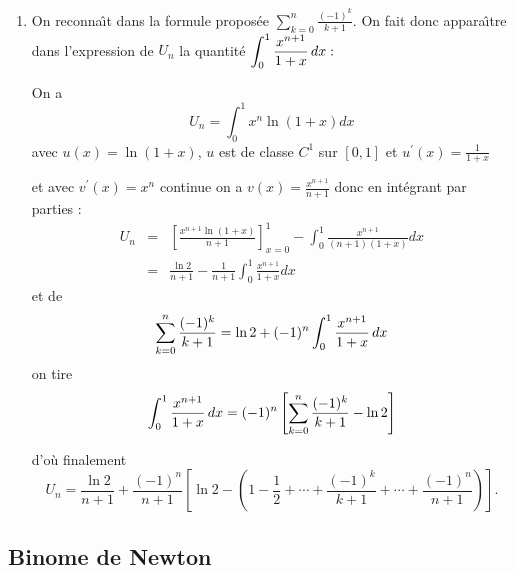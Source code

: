 \begin{correction}
\begin{enumerate}
\begin{enumerate}
\item On reconna\^{\i}t dans la formule propos\'{e}e $\displaystyle%
\sum_{k=0}^{n}\frac{(-1)^{k}}{k+1}$. On fait donc appara\^{\i}tre dans
l'expression de $U_{n}$ la quantit\'{e} $\displaystyle\int_{0}^{1}\frac{%
x^{n+1}}{1+x}\,dx:$

On a 
\begin{equation*}
U_{n}=\int_{0}^{1}x^{n}\ln \left( 1+x\right) dx
\end{equation*}
avec $u\left( x\right) =\ln \left( 1+x\right) $, $u$ est de classe $C^{1}$
sur $\left[ 0,1\right] $ et $u^{\prime }\left( x\right) =\displaystyle
\frac{1}{1+x}$

et avec $v^{\prime }\left( x\right) =x^{n}$ continue on a $v\left( x\right) =%
\displaystyle
\frac{x^{n+1}}{n+1}$ donc en int\'{e}grant par parties : 
\begin{eqnarray*}
U_{n} &=&\left[ \frac{x^{n+1}\ln \left( 1+x\right) }{n+1}\right]
_{x=0}^{1}-\int_{0}^{1}\frac{x^{n+1}}{\left( n+1\right) \left( 1+x\right) }dx
\\
&=&\frac{\ln 2}{n+1}-\frac{1}{n+1}\int_{0}^{1}\frac{x^{n+1}}{1+x}dx
\end{eqnarray*}
et de 
\begin{equation*}
\sum_{k=0}^{n}\frac{(-1)^{k}}{k+1}=\ln 2+(-1)^{n}\int_{0}^{1}\frac{x^{n+1}}{%
1+x}\,dx
\end{equation*}
on tire 
\begin{equation*}
\int_{0}^{1}\frac{x^{n+1}}{1+x}\,dx=(-1)^{n}\left[ \sum_{k=0}^{n}\frac{%
(-1)^{k}}{k+1}-\ln 2\right]
\end{equation*}

d'o\`{u} finalement 
\begin{equation*}
U_{n}=\frac{\ln 2}{n+1}+\frac{(-1)^{n}}{n+1}\left[ \ln 2-\left( 1-\frac{1}{2}%
+\cdots +\frac{(-1)^{k}}{k+1}+\cdots +\frac{(-1)^{n}}{n+1}\right) \right] .
\end{equation*}
\end{enumerate}

\end{enumerate}


\end{correction}



\subsection{Binome de Newton}


